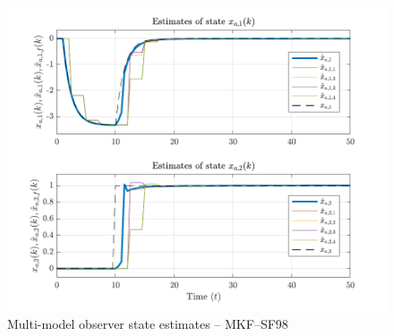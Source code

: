 \begin{figure}[htp]
	\centering
	\includegraphics[width=13cm]{images/rod_MKF_test_sim_MKF_SF98_x_est.pdf}
	\caption{Multi-model observer state estimates – MKF--SF98}
	\label{fig:rod-obs-sim-test-x_est-SF98}
\end{figure}

